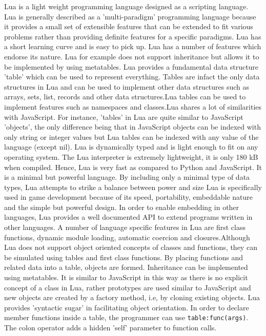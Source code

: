 Lua is a light weight programming language designed as a scripting language. Lua is generally described as a 'multi-paradigm' programming language because it provides a small set of extensible features that can be extended to fit various problems rather than providing definite features for a specific paradigms. Lua has a short learning curve and is easy to pick up. Lua has a number of features which endorse its  nature. Lua for example does not support inheritance but allows it to be implemented by using metatables.
Lua provides a fundamental data structure 'table' which can be used to represent everything. Tables are infact the only data structures in Lua and can be used to implement other data structures such as arrays, sets, list, records and other data structures.Lua tables can be used to implement features such as namespaces and classes.Lua shares a lot of similarities with JavaScript. For instance, 'tables' in Lua are quite similar to JavaScript 'objects', the only difference being that in JavaScript objects can be indexed with only string or integer values but Lua tables can be indexed with any value of the language (except nil). 
Lua is dynamically typed and is light enough to fit on any operating system. The Lua interpreter is extremely lightweight, it is only 180 kB when compiled. Hence, Lua is very fast as compared to Python and JavaScript. It is a minimal but powerful language. By including only a minimal type of data types, Lua attempts to strike a balance between power and size \cite{about_lua}
Lua is specifically used in game development because of its speed, portability, embeddable nature and the simple but powerful design. In order to enable embedding in other languages, Lua provides a well documented API to extend programs written in other languages. 
A number of language specific features in Lua are first class functions, dynamic module loading, automatic coercion and closures.Although Lua does not support object oriented concepts of classes and functions, they can be simulated using tables and first class functions. By placing functions and related data into a table, objects are formed. Inheritance can be implemented  using metatables. It is similar to JavaScript in this way as there is no explicit concept of a class in Lua, rather prototypes are used similar to JavaScript and new objects are created by a factory method, i.e, by cloning existing objects. Lua provides 'syntactic sugar' in facilitating object orientation. In order to declare member functions inside a table, the programmer can use \texttt{table:func(args)}. The colon operator adds a hidden 'self' parameter to function calls.
